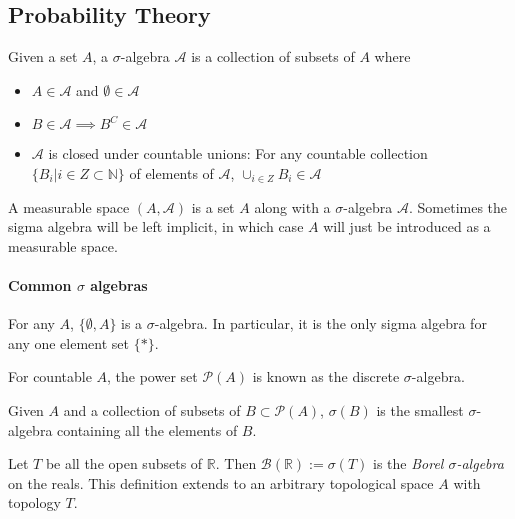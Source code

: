 
\begin{theorem}[Representation]\label{th:representaiton}
\end{theorem}


\subsection{Probability Theory}

Given a set $A$, a $\sigma$-algebra $\mathcal{A}$ is a collection of subsets of $A$ where
\begin{itemize}
	\item $A\in \mathcal{A}$ and $\emptyset\in \mathcal{A}$
	\item $B\in \mathcal{A}\implies B^C\in\mathcal{A}$
	\item $\mathcal{A}$ is closed under countable unions: For any countable collection $\{B_i|i\in Z\subset \mathbb{N}\}$ of elements of $\mathcal{A}$, $\cup_{i\in Z}B_i\in \mathcal{A}$ 
\end{itemize}

A measurable space $(A,\mathcal{A})$ is a set $A$ along with a $\sigma$-algebra $\mathcal{A}$. Sometimes the sigma algebra will be left implicit, in which case $A$ will just be introduced as a measurable space.

\paragraph{Common $\sigma$ algebras}

For any $A$, $\{\emptyset,A\}$ is a $\sigma$-algebra. In particular, it is the only sigma algebra for any one element set $\{*\}$.

For countable $A$, the power set $\mathscr{P}(A)$ is known as the discrete $\sigma$-algebra.

Given $A$ and a collection of subsets of $B\subset\mathscr{P}(A)$, $\sigma(B)$ is the smallest $\sigma$-algebra containing all the elements of $B$. 

Let $T$ be all the open subsets of $\mathbb{R}$. Then $\mathcal{B}(\mathbb{R}):=\sigma(T)$ is the \emph{Borel $\sigma$-algebra} on the reals. This definition extends to an arbitrary topological space $A$ with topology $T$.

